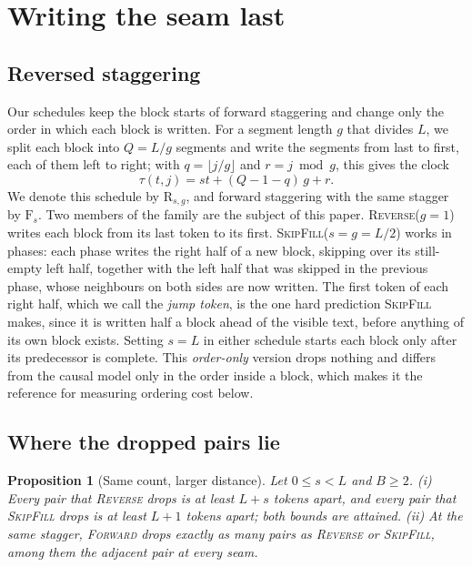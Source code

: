 \documentclass{article}
\newtheorem{proposition}{Proposition}
\theoremstyle{definition}
\theoremstyle{remark}
\newcommand{\name}[1]{\textup{\textsc{#1}}}
\newcommand{\sfill}{\name{SkipFill}\xspace}
\newcommand{\rev}{\name{Reverse}\xspace}
\newcommand{\fwd}{\name{Forward}\xspace}
\newcommand{\Rsg}[2]{\mathrm{R}_{#1,#2}}
\newcommand{\Fs}[1]{\mathrm{F}_{#1}}
\begin{document}
\section{Writing the seam last}
\label{sec:method}

\subsection{Reversed staggering}

Our schedules keep the block starts of forward staggering and change only the order in which each block is written.
For a segment length $g$ that divides $L$, we split each block into $Q=L/g$ segments and write the segments from last to first, each of them left to right; with $q=\lfloor j/g\rfloor$ and $r=j\bmod g$, this gives the clock
\begin{equation}
  \tau(t,j)=st+(Q-1-q)\,g+r .
  \label{eq:clock}
\end{equation}
We denote this schedule by $\Rsg{s}{g}$, and forward staggering with the same stagger by $\Fs{s}$.
Two members of the family are the subject of this paper.
\rev ($g=1$) writes each block from its last token to its first.
\sfill ($s=g=L/2$) works in phases: each phase writes the right half of a new block, skipping over its still-empty left half, together with the left half that was skipped in the previous phase, whose neighbours on both sides are now written.
The first token of each right half, which we call the \emph{jump token}, is the one hard prediction \sfill makes, since it is written half a block ahead of the visible text, before anything of its own block exists.
Setting $s=L$ in either schedule starts each block only after its predecessor is complete.
This \emph{order-only} version drops nothing and differs from the causal model only in the order inside a block, which makes it the reference for measuring ordering cost below.

\subsection{Where the dropped pairs lie}
\label{sec:lemma}

\begin{proposition}[Same count, larger distance]
\label{prop:distance}
Let $0\le s<L$ and $B\ge2$.
(i) Every pair that \rev drops is at least $L+s$ tokens apart, and every pair that \sfill drops is at least $L+1$ tokens apart; both bounds are attained.
(ii) At the same stagger, \fwd drops exactly as many pairs as \rev or \sfill, among them the adjacent pair at every seam.
\end{proposition}
\end{document}
